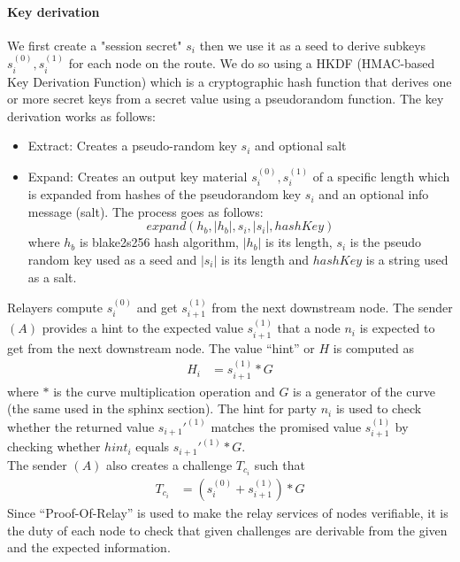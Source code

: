     \paragraph{Key derivation}
    We first create a "session secret" $s_i$ then we use it as a seed to derive subkeys $s_i^{(0)},s_i^{(1)}$ for each node on the route. We do so using a HKDF (HMAC-based Key Derivation Function) which is a cryptographic hash function that derives one or more secret keys from a secret value using a pseudorandom function. The key derivation works as follows:
    \begin{itemize}
        \item Extract: Creates a pseudo-random key $s_i$ and optional salt       
        \item Expand: Creates an output key material $s_i^{(0)},s_i^{(1)}$ of a specific length which is expanded from hashes of the pseudorandom key $s_i$ and an optional info message (salt). The process goes as follows:
        $$expand(h_b, |h_b|,s_i, |s_i|, hashKey)$$
        where $h_b$ is blake2s256 hash algorithm, $|h_b|$ is its length, $s_i$ is the pseudo random key used as a seed and $|s_i|$ is its length and $hashKey$ is a string used as a salt.

    \end{itemize}
 Relayers compute $s_i^{(0)}$ and get $s_{i+1}^{(1)}$ from the next downstream node.
    \newline The sender $(A)$ provides a hint to the expected value $s_{i+1}^{(1)}$ that a node $n_i$ is expected to get from the next downstream node.
    The value “hint” or $H$ is computed as 
    \begin{align}  
        H_i&=s_{i+1}^{(1)}*G
         \end{align}
    where $*$ is the curve multiplication operation and $G$ is a generator of the curve (the same used in the sphinx section). 
    \newline The hint for party $n_i$ is used to check whether the returned value $s_{i+1}'^{(1)}$ matches the promised value $s_{i+1}^{(1)}$ by checking whether $hint_i$ equals $s_{i+1}'^{(1)}*G$. 
   \\The sender $(A)$ also creates a challenge $T_{c_i}$ such that 
   \begin{align}  
    T_{c_i}&=(s_i^{(0)}+s_{i+1}^{(1)})*G
     \end{align}
   Since “Proof-Of-Relay” is used to make the relay services of nodes verifiable, it is the duty of each node to check that given challenges are derivable from the given and the expected information.

